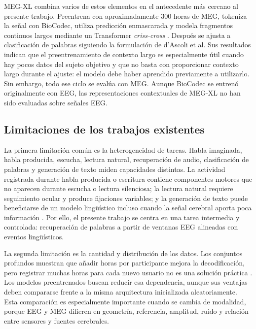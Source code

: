 MEG-XL combina varios de estos elementos en el antecedente más cercano al presente trabajo. Preentrena con aproximadamente 300 horas de MEG, tokeniza la señal con BioCodec, utiliza predicción enmascarada y modela fragmentos continuos largos mediante un Transformer \textit{criss-cross} \cite{jayalath2026megxl}. Después se ajusta a clasificación de palabras siguiendo la formulación de d'Ascoli et al. Sus resultados indican que el preentrenamiento de contexto largo es especialmente útil cuando hay pocos datos del sujeto objetivo y que no basta con proporcionar contexto largo durante el ajuste: el modelo debe haber aprendido previamente a utilizarlo. Sin embargo, todo ese ciclo se evalúa con MEG. Aunque BioCodec se entrenó originalmente con EEG, las representaciones contextuales de MEG-XL no han sido evaluadas sobre señales EEG.

\subsection{Limitaciones de los trabajos existentes}

La primera limitación común es la heterogeneidad de tareas. Habla imaginada, habla producida, escucha, lectura natural, recuperación de audio, clasificación de palabras y generación de texto miden capacidades distintas. La actividad registrada durante habla producida o escritura contiene componentes motores que no aparecen durante escucha o lectura silenciosa; la lectura natural requiere seguimiento ocular y produce fijaciones variables; y la generación de texto puede beneficiarse de un modelo lingüístico incluso cuando la señal cerebral aporta poca información \cite{dimigen2011coregistration,hollenstein2020zuco2,jo2024eegtext}. Por ello, el presente trabajo se centra en una tarea intermedia y controlada: recuperación de palabras a partir de ventanas EEG alineadas con eventos lingüísticos.

La segunda limitación es la cantidad y distribución de los datos. Los conjuntos profundos muestran que añadir horas por participante mejora la decodificación, pero registrar muchas horas para cada nuevo usuario no es una solución práctica \cite{sato2024scaling,ozdogan2025libribrain,dascoli2025words}. Los modelos preentrenados buscan reducir esa dependencia, aunque sus ventajas deben compararse frente a la misma arquitectura inicializada aleatoriamente. Esta comparación es especialmente importante cuando se cambia de modalidad, porque EEG y MEG difieren en geometría, referencia, amplitud, ruido y relación entre sensores y fuentes cerebrales.

